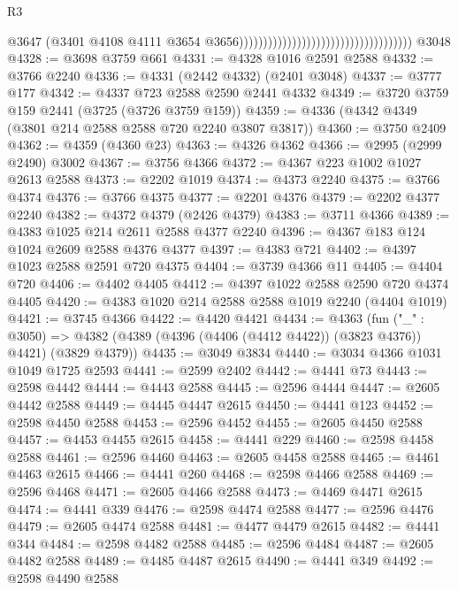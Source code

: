 \begin{lexlean}{R3}
\begin{coremodule}
                                                                          @3647
                                                                          (@3401
                                                                            @4108
                                                                            @4111
                                                                            @3654
                                                                            @3656))))))))))))))))))))))))))))))))))))
    @3048
@4328 := @3698 @3759 @661
@4331 := @4328 @1016 @2591 @2588
@4332 := @3766 @2240
@4336 := @4331 (@2442 @4332) (@2401 @3048)
@4337 := @3777 @177
@4342 := @4337 @723 @2588 @2590 @2441 @4332
@4349 := @3720 @3759 @159 @2441 (@3725 (@3726 @3759 @159))
@4359 := @4336 (@4342 @4349 (@3801 @214 @2588 @2588 @720 @2240 @3807 @3817))
@4360 := @3750 @2409
@4362 := @4359 (@4360 @23)
@4363 := @4326 @4362
@4366 := @2995 (@2999 @2490) @3002
@4367 := @3756 @4366
@4372 := @4367 @223 @1002 @1027 @2613 @2588
@4373 := @2202 @1019
@4374 := @4373 @2240
@4375 := @3766 @4374
@4376 := @3766 @4375
@4377 := @2201 @4376
@4379 := @2202 @4377 @2240
@4382 := @4372 @4379 (@2426 @4379)
@4383 := @3711 @4366
@4389 := @4383 @1025 @214 @2611 @2588 @4377 @2240
@4396 := @4367 @183 @124 @1024 @2609 @2588 @4376 @4377
@4397 := @4383 @721
@4402 := @4397 @1023 @2588 @2591 @720 @4375
@4404 := @3739 @4366 @11
@4405 := @4404 @720
@4406 := @4402 @4405
@4412 := @4397 @1022 @2588 @2590 @720 @4374 @4405
@4420 := @4383 @1020 @214 @2588 @2588 @1019 @2240 (@4404 @1019)
@4421 := @3745 @4366
@4422 := @4420 @4421
@4434 := @4363
    (fun ("_" : @3050) =>
    @4382 (@4389 (@4396 (@4406 (@4412 @4422)) (@3823 @4376)) @4421) (@3829 @4379))
@4435 := @3049 @3834
@4440 := @3034 @4366 @1031 @1049 @1725 @2593
@4441 := @2599 @2402
@4442 := @4441 @73
@4443 := @2598 @4442
@4444 := @4443 @2588
@4445 := @2596 @4444
@4447 := @2605 @4442 @2588
@4449 := @4445 @4447 @2615
@4450 := @4441 @123
@4452 := @2598 @4450 @2588
@4453 := @2596 @4452
@4455 := @2605 @4450 @2588
@4457 := @4453 @4455 @2615
@4458 := @4441 @229
@4460 := @2598 @4458 @2588
@4461 := @2596 @4460
@4463 := @2605 @4458 @2588
@4465 := @4461 @4463 @2615
@4466 := @4441 @260
@4468 := @2598 @4466 @2588
@4469 := @2596 @4468
@4471 := @2605 @4466 @2588
@4473 := @4469 @4471 @2615
@4474 := @4441 @339
@4476 := @2598 @4474 @2588
@4477 := @2596 @4476
@4479 := @2605 @4474 @2588
@4481 := @4477 @4479 @2615
@4482 := @4441 @344
@4484 := @2598 @4482 @2588
@4485 := @2596 @4484
@4487 := @2605 @4482 @2588
@4489 := @4485 @4487 @2615
@4490 := @4441 @349
@4492 := @2598 @4490 @2588

\end{coremodule}
\end{lexlean}
